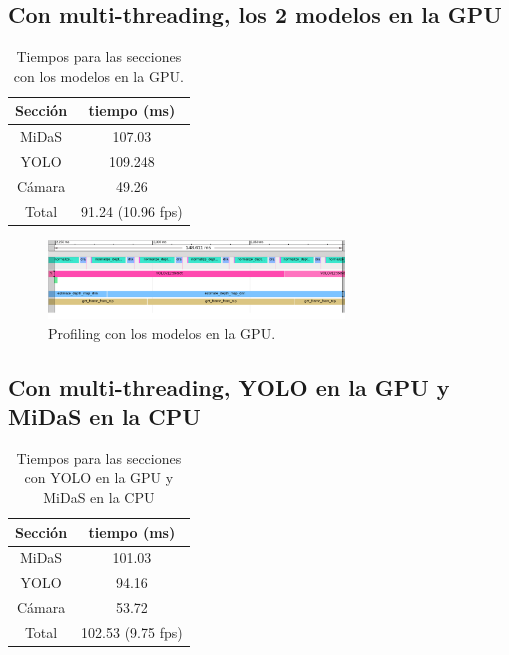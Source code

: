         \subsection{Con multi-threading, los 2 modelos en la GPU}
\begin{table}[H]
    \centering
    \begin{tabular}{|c|c|}
        \hline
        \textbf{Sección} & \textbf{tiempo (ms)}  \\
        \hline
        MiDaS   & 107.03     \\
        YOLO    & 109.248    \\
        Cámara  & 49.26   \\
        Total   & 91.24 (10.96 fps)    \\

        \hline
    \end{tabular}
    \caption{Tiempos para las secciones con los modelos en la GPU.}
    \label{tab:gpu2}
\end{table}


\begin{figure}[H]
    \centering
    \includegraphics[width=0.7\textwidth]{images/2gpu_prof.png}
    \caption{Profiling con los modelos en la GPU.}
    \label{fig:gpu2_prof}
\end{figure}



        \subsection{Con multi-threading, YOLO en la GPU y MiDaS en la CPU}
\begin{table}[H]
    \centering
    \begin{tabular}{|c|c|}
        \hline
        \textbf{Sección} & \textbf{tiempo (ms)}  \\
        \hline
        MiDaS   & 101.03     \\
        YOLO    & 94.16    \\
        Cámara  & 53.72   \\
        Total   & 102.53 (9.75 fps)    \\

        \hline
    \end{tabular}
    \caption{Tiempos para las secciones con YOLO en la GPU y MiDaS en la CPU}
    \label{tab:yologpu_midas_cpu}
\end{table}


